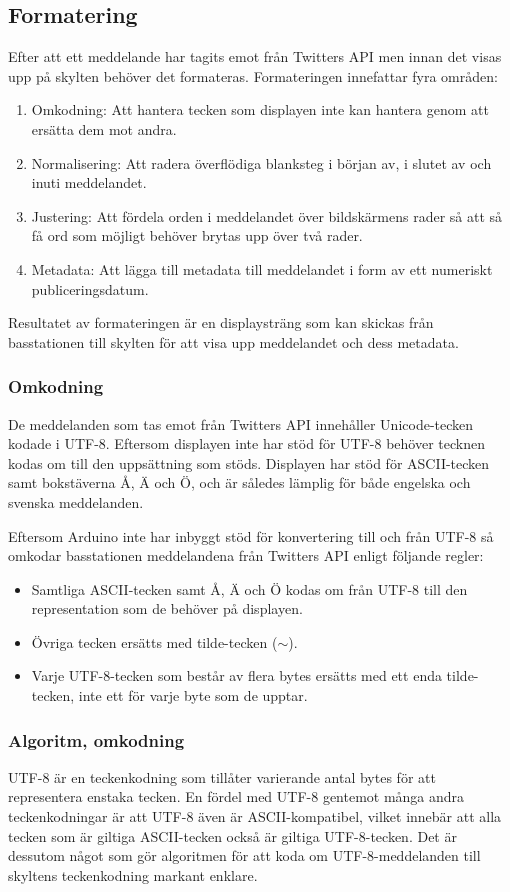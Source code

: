\documentclass[a4paper,11pt]{article}
\begin{document}
\subsection{Formatering}
Efter att ett meddelande har tagits emot från Twitters API men innan det visas upp på skylten behöver det formateras. Formateringen innefattar fyra områden:
	\begin{enumerate}
    	\item Omkodning: Att hantera tecken som displayen inte kan hantera genom att ersätta dem mot andra.
    	\item Normalisering: Att radera överflödiga blanksteg i början av, i slutet av och inuti meddelandet.
    	\item Justering: Att fördela orden i meddelandet över bildskärmens rader så att så få ord som möjligt behöver brytas upp över två rader.
    	\item Metadata: Att lägga till metadata till meddelandet i form av ett numeriskt publiceringsdatum.
	\end{enumerate}

Resultatet av formateringen är en displaysträng som kan skickas från basstationen till skylten för att visa upp meddelandet och dess metadata.

\subsubsection{Omkodning}
De meddelanden som tas emot från Twitters API innehåller Unicode-tecken kodade i UTF-8. Eftersom displayen inte har stöd för UTF-8 behöver tecknen kodas om till den uppsättning som stöds. Displayen har stöd för ASCII-tecken samt bokstäverna Å, Ä och Ö, och är således lämplig för både engelska och svenska meddelanden.

Eftersom Arduino inte har inbyggt stöd för konvertering till och från UTF-8 så omkodar basstationen meddelandena från Twitters API enligt följande regler:
	\begin{itemize}
    	\item Samtliga ASCII-tecken samt Å, Ä och Ö kodas om från UTF-8 till den representation som de behöver på displayen.
    	\item Övriga tecken ersätts med tilde-tecken ($\sim$).
    	\item Varje UTF-8-tecken som består av flera bytes ersätts med ett enda tilde-tecken, inte ett för varje byte som de upptar.
	\end{itemize}

\subsubsection{Algoritm, omkodning}
UTF-8 är en teckenkodning som tillåter varierande antal bytes för att representera enstaka tecken. En fördel med UTF-8 gentemot många andra teckenkodningar är att UTF-8 även är ASCII-kompatibel, vilket innebär att alla tecken som är giltiga ASCII-tecken också är giltiga UTF-8-tecken. Det är dessutom något som gör algoritmen för att koda om UTF-8-meddelanden till skyltens teckenkodning markant enklare. \\
\end{document}
